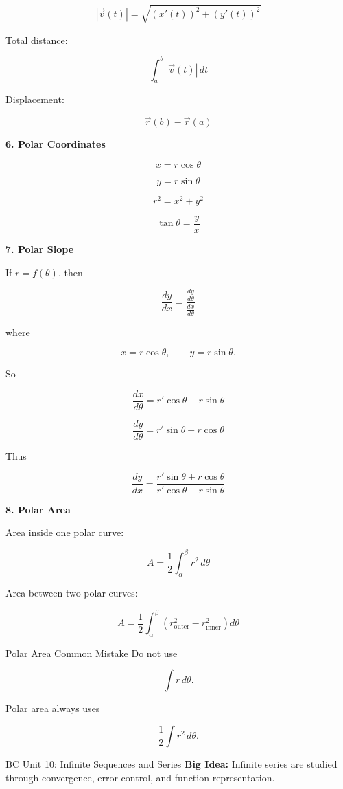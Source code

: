 \documentclass[11pt]{article}
\newcommand{\subtopic}[1]{
\vspace{0.45em}
\textcolor{novelPurpleDark}{\textbf{#1}}
}
\begin{document}
\[
|\vec v(t)|=\sqrt{(x'(t))^2+(y'(t))^2}
\]

Total distance:

\[
\int_a^b |\vec v(t)|\,dt
\]

Displacement:

\[
\vec r(b)-\vec r(a)
\]

\subtopic{6. Polar Coordinates}

\[
x=r\cos\theta
\]

\[
y=r\sin\theta
\]

\[
r^2=x^2+y^2
\]

\[
\tan\theta=\frac{y}{x}
\]

\subtopic{7. Polar Slope}

If \(r=f(\theta)\), then

\[
\frac{dy}{dx}
=
\frac{\frac{dy}{d\theta}}{\frac{dx}{d\theta}}
\]

where

\[
x=r\cos\theta,\qquad y=r\sin\theta.
\]

So

\[
\frac{dx}{d\theta}=r'\cos\theta-r\sin\theta
\]

\[
\frac{dy}{d\theta}=r'\sin\theta+r\cos\theta
\]

Thus

\[
\frac{dy}{dx}
=
\frac{r'\sin\theta+r\cos\theta}{r'\cos\theta-r\sin\theta}
\]

\subtopic{8. Polar Area}

Area inside one polar curve:

\[
A=\frac12\int_\alpha^\beta r^2\,d\theta
\]

Area between two polar curves:

\[
A=\frac12\int_\alpha^\beta \left(r_{\text{outer}}^2-r_{\text{inner}}^2\right)d\theta
\]

\begin{warningbox}{Polar Area Common Mistake}
Do not use

\[
\int r\,d\theta.
\]

Polar area always uses

\[
\frac12\int r^2\,d\theta.
\]
\end{warningbox}

\newpage

\begin{unitbox}{BC Unit 10: Infinite Sequences and Series}
\textbf{Big Idea:} Infinite series are studied through convergence, error control, and function representation.
\end{unitbox}
\end{document}

